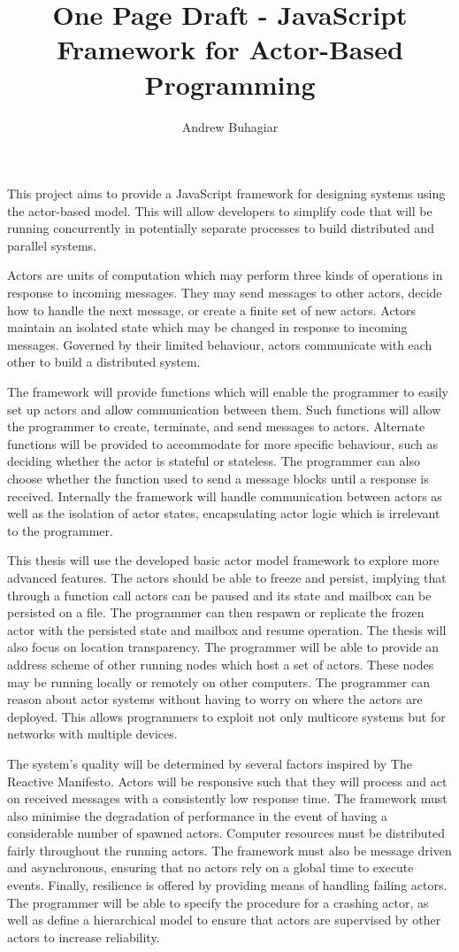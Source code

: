 \documentclass[12pt]{report}
\author{Andrew Buhagiar}
\title{One Page Draft - JavaScript Framework for Actor-Based Programming}
\begin{document}
\maketitle
This project aims to provide a JavaScript framework for designing systems using the actor-based model. This will allow developers to simplify code that will be running concurrently in potentially separate processes to build distributed and parallel systems.

Actors are units of computation which may perform three kinds of operations in response to incoming messages\cite{agha_1986}. They may send messages to other actors, decide how to handle the next message, or create a finite set of new actors. Actors maintain an isolated state which may be changed in response to incoming messages. Governed by their limited behaviour, actors communicate with each other to build a distributed system.

The framework will provide functions which will enable the programmer to easily set up actors and allow communication between them. Such functions will allow the programmer to create, terminate, and send messages to actors. Alternate functions will be provided to accommodate for more specific behaviour, such as deciding whether the actor is stateful or stateless. The programmer can also choose whether the function used to send a message blocks until a response is received. Internally the framework will handle communication between actors as well as the isolation of actor states, encapsulating actor logic which is irrelevant to the programmer. 

This thesis will use the developed basic actor model framework to explore more advanced features. The actors should be able to freeze and persist, implying that through a function call actors can be paused and its state and mailbox can be persisted on a file. The programmer can then respawn or replicate the frozen actor with the persisted state and mailbox and resume operation. The thesis will also focus on location transparency. The programmer will be able to provide an address scheme of other running nodes which host a set of actors. These nodes may be running locally or remotely on other computers. The programmer can reason about actor systems without having to worry on where the actors are deployed. This allows programmers to exploit not only multicore systems but for networks with multiple devices.

The system’s quality will be determined by several factors inspired by The Reactive Manifesto\cite{reactivemanifesto}. Actors will be responsive such that they will process and act on received messages with a consistently low response time. The framework must also minimise the degradation of performance in the event of having a considerable number of spawned actors. Computer resources must be distributed fairly throughout the running actors. The framework must also be message driven and asynchronous, ensuring that no actors rely on a global time to execute events. Finally, resilience is offered by providing means of handling failing actors. The programmer will be able to specify the procedure for a crashing actor, as well as define a hierarchical model to ensure that actors are supervised by other actors to increase reliability.


\end{document}
